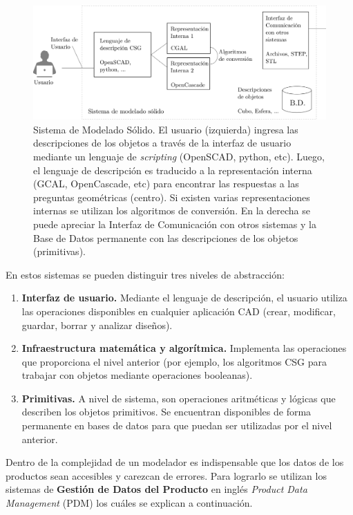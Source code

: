 \begin{figure}[ht]
\includegraphics[width=16cm]{Img/GEO/sistema-solido.png}
\centering
\caption{ \footnotesize{Sistema de Modelado Sólido. El usuario (izquierda) ingresa las descripciones de los objetos a través de la interfaz de usuario mediante un lenguaje de \textit{scripting} (OpenSCAD, python, etc). Luego, el lenguaje de descripción es traducido a la representación interna (GCAL, OpenCascade, etc) para encontrar las respuestas a las preguntas geométricas (centro). Si existen varias representaciones internas se utilizan los algoritmos de conversión. En la derecha se puede apreciar la Interfaz de Comunicación con otros sistemas y la Base de Datos permanente con las descripciones de los objetos (primitivas). \citep{Ramos2011}}}
\label{fig:sistema-solido}
\end{figure}

En estos sistemas se pueden distinguir tres niveles de abstracción:

\begin{enumerate}
\item \textbf{Interfaz de usuario.} Mediante el lenguaje de descripción, el usuario utiliza las operaciones disponibles en cualquier aplicación CAD (crear, modificar, guardar, borrar y analizar diseños).
\item \textbf{Infraestructura matemática y algorítmica.}  Implementa las operaciones que proporciona el nivel anterior (por ejemplo, los algoritmos CSG para trabajar con objetos mediante operaciones booleanas).
\item \textbf{Primitivas.} A nivel de sistema, son operaciones aritméticas y lógicas que describen los objetos primitivos. Se encuentran disponibles de forma permanente en bases de datos para que puedan ser utilizadas por el nivel anterior.
\end{enumerate}

Dentro de la complejidad de un modelador es indispensable que los datos de los productos sean accesibles y carezcan de errores.
Para lograrlo se utilizan los sistemas de  \textbf{Gestión de Datos del Producto} en inglés \textit{Product Data Management} (PDM) \citep{Ruiz} los cuáles se explican a continuación.



